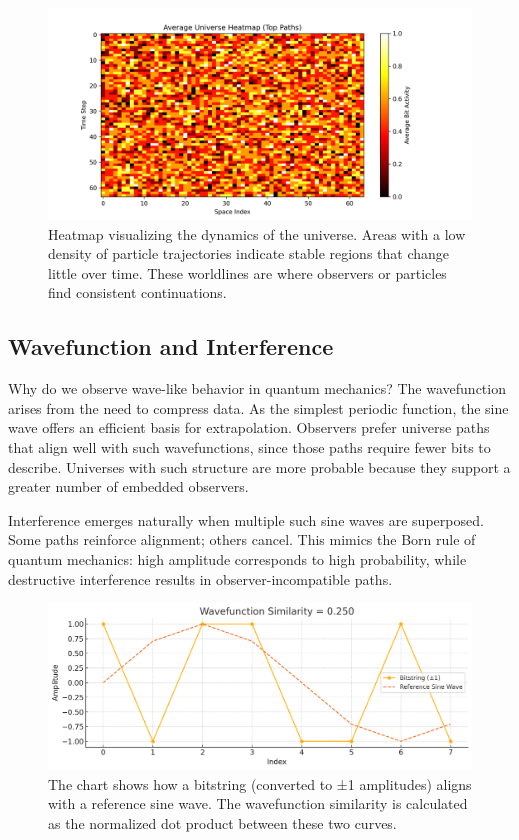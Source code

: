 \documentclass[12pt]{article}
\begin{document}
\begin{figure}[h!]
    \centering
    \includegraphics[width=1.0\textwidth]{figures/average_universe_heatmap.png}
    \caption{Heatmap visualizing the dynamics of the universe. Areas with a low density of particle trajectories indicate stable regions that change little over time. These worldlines are where observers or particles find consistent continuations.}
    \label{fig:average_universe_heatmap}
\end{figure}

\subsection{Wavefunction and Interference}

Why do we observe wave-like behavior in quantum mechanics? The wavefunction arises from the need to compress data. As the simplest periodic function, the sine wave offers an efficient basis for extrapolation. Observers prefer universe paths that align well with such wavefunctions, since those paths require fewer bits to describe. Universes with such structure are more probable because they support a greater number of embedded observers.

Interference emerges naturally when multiple such sine waves are superposed. Some paths reinforce alignment; others cancel. This mimics the Born rule of quantum mechanics: high amplitude corresponds to high probability, while destructive interference results in observer-incompatible paths.

\begin{figure}[h!]
    \centering
    \includegraphics[width=1.0\textwidth]{figures/wavefunction_similarity.png}
    \caption{The chart shows how a bitstring (converted to ±1 amplitudes) aligns with a reference sine wave.
        The wavefunction similarity is calculated as the normalized dot product between these two curves.}
    \label{fig:wavefunction_similarity}
\end{figure}
\end{document}
